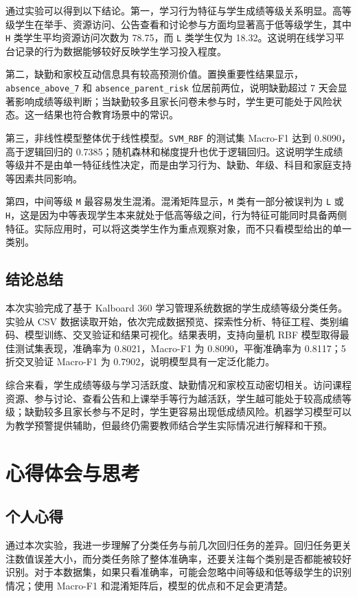 \documentclass[UTF8,a4paper,12pt]{ctexart}
\begin{document}
通过实验可以得到以下结论。第一，学习行为特征与学生成绩等级关系明显。高等级学生在举手、资源访问、公告查看和讨论参与方面均显著高于低等级学生，其中 \texttt{H} 类学生平均资源访问次数为 78.75，而 \texttt{L} 类学生仅为 18.32。这说明在线学习平台记录的行为数据能够较好反映学生学习投入程度。

第二，缺勤和家校互动信息具有较高预测价值。置换重要性结果显示，\texttt{absence\_above\_7} 和 \texttt{absence\_parent\_risk} 位居前两位，说明缺勤超过 7 天会显著影响成绩等级判断；当缺勤较多且家长问卷未参与时，学生更可能处于风险状态。这一结果也符合教育场景中的常识。

第三，非线性模型整体优于线性模型。\texttt{SVM\_RBF} 的测试集 Macro-F1 达到 0.8090，高于逻辑回归的 0.7385；随机森林和梯度提升也优于逻辑回归。这说明学生成绩等级并不是由单一特征线性决定，而是由学习行为、缺勤、年级、科目和家庭支持等因素共同影响。

第四，中间等级 \texttt{M} 最容易发生混淆。混淆矩阵显示，\texttt{M} 类有一部分被误判为 \texttt{L} 或 \texttt{H}，这是因为中等表现学生本来就处于低高等级之间，行为特征可能同时具备两侧特征。实际应用时，可以将这类学生作为重点观察对象，而不只看模型给出的单一类别。

\subsection{结论总结}

本次实验完成了基于 Kalboard 360 学习管理系统数据的学生成绩等级分类任务。实验从 CSV 数据读取开始，依次完成数据预览、探索性分析、特征工程、类别编码、模型训练、交叉验证和结果可视化。结果表明，支持向量机 RBF 模型取得最佳测试集表现，准确率为 0.8021，Macro-F1 为 0.8090，平衡准确率为 0.8117；5 折交叉验证 Macro-F1 为 0.7902，说明模型具有一定泛化能力。

综合来看，学生成绩等级与学习活跃度、缺勤情况和家校互动密切相关。访问课程资源、参与讨论、查看公告和上课举手等行为越活跃，学生越可能处于较高成绩等级；缺勤较多且家长参与不足时，学生更容易出现低成绩风险。机器学习模型可以为教学预警提供辅助，但最终仍需要教师结合学生实际情况进行解释和干预。

\section{心得体会与思考}

\subsection{个人心得}

通过本次实验，我进一步理解了分类任务与前几次回归任务的差异。回归任务更关注数值误差大小，而分类任务除了整体准确率，还要关注每个类别是否都能被较好识别。对于本数据集，如果只看准确率，可能会忽略中间等级和低等级学生的识别情况；使用 Macro-F1 和混淆矩阵后，模型的优点和不足会更清楚。
\end{document}
